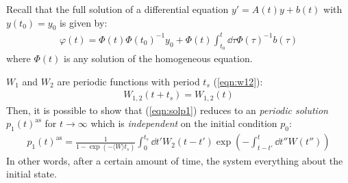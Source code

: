 \documentclass[../template.tex]{subfiles}
\begin{document}
\begin{expl}
    Recall that the full solution of a differential equation $y' = A(t)y + b(t)$ with $y(t_0) = y_0$ is given by:
    \begin{align*}
        \varphi(t) = \Phi(t) \Phi(t_0)^{-1} y_0 + \Phi(t) \int_{t_0}^t \dd{\tau} \Phi(\tau)^{-1} b(\tau)
    \end{align*}
    where $\Phi(t)$ is any solution of the homogeneous equation.
\end{expl}
$W_1$ and $W_2$ are periodic functions with period $t_s$ (\ref{eqn:w12}):
\begin{align*}
    W_{1,2}(t+t_s) = W_{1,2}(t)
\end{align*}
Then, it is possible to show that (\ref{eqn:solp1}) reduces to an \textit{periodic solution} $p_1(t)^{\mathrm{as}}$ for $t \to \infty$ which is \textit{independent} on the initial condition $p_0$:
\begin{align}
    p_1(t)^{\mathrm{as}} = \frac{1}{1- \exp(-\langle W \rangle t_s) }  \int_0^{t_s} \dd{t'} W_2(t-t') \exp\left(-\int_{t-t'}^t \dd{t''} W(t'')\right) \label{eqn:periodic-asymptote}
\end{align}
In other words, after a certain amount of time, the system  everything about the initial state.
\end{document}
